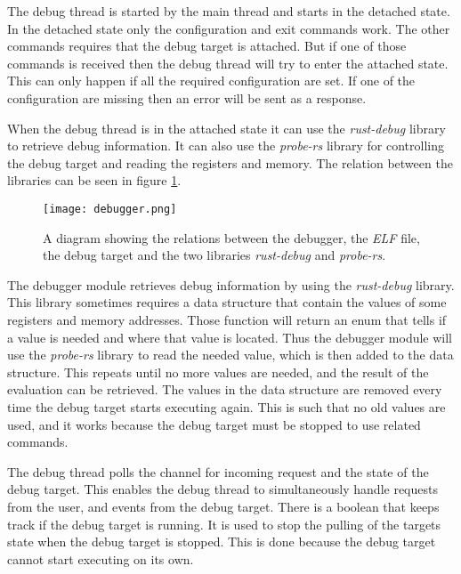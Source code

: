 The debug thread is started by the main thread and starts in the detached state.
In the detached state only the configuration and exit commands work.
The other commands requires that the debug target is attached.
But if one of those commands is received then the debug thread will try to enter the attached state.
This can only happen if all the required configuration are set.
If one of the configuration are missing then an error will be sent as a response.


When the debug thread is in the attached state it can use the \emph{rust-debug} library to retrieve debug information.
It can also use the \emph{probe-rs} library for controlling the debug target and reading the registers and memory.
The relation between the libraries can be seen in figure \ref{fig:debugger}.


\begin{figure}[h]
	\centering
	\texttt{[image: debugger.png]}
	\caption{A diagram showing the relations between the debugger, the \emph{ELF} file, the debug target and the two libraries \emph{rust-debug} and \emph{probe-rs}.}
	\label{fig:debugger}
\end{figure}


The debugger module retrieves debug information by using the \emph{rust-debug} library.
This library sometimes requires a data structure that contain the values of some registers and memory addresses.
Those function will return an enum that tells if a value is needed and where that value is located.
Thus the debugger module will use the \emph{probe-rs} library to read the needed value, which is then added to the data structure.
This repeats until no more values are needed, and the result of the evaluation can be retrieved.
The values in the data structure are removed every time the debug target starts executing again.
This is such that no old values are used, and it works because the debug target must be stopped to use related commands.



The debug thread polls the channel for incoming request and the state of the debug target.
This enables the debug thread to simultaneously handle requests from the user, and events from the debug target.
There is a boolean that keeps track if the debug target is running.
It is used to stop the pulling of the targets state when the debug target is stopped.
This is done because the debug target cannot start executing on its own.


